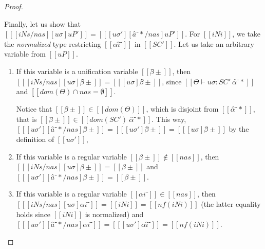 \begin{proof}
\begin{caseof}
        Finally, let us show that $[[ [iNs/nas][uσ]uP' ]] = [[ [uσ'][â⁻*/nas]uP' ]]$.
        For $[[iNi]]$, we take the \emph{normalized} type restricting $[[αî⁻]]$ in $[[SC']]$.
        Let us take an arbitrary variable from $[[uP]]$.
        \begin{enumerate}
            \item If this variable is a unification variable $[[β̂±]]$, then
                $[[ [iNs/nas][uσ] β̂± ]] = [[ [uσ]β̂± ]] $, since $[[Θ ⊢ uσ : SC' \ {α̂⁻*}]]$ and 
                $[[ dom(Θ) ∩ {nas} = ∅ ]]$. 

                Notice that $[[β̂±]] \in [[dom(Θ)]]$, which is disjoint from $[[{α̂⁻*}]]$, 
                that is $[[β̂±]] \in [[dom(SC') \ {α̂⁻*}]]$. This way,
                $[[ [uσ'][â⁻*/nas]β̂± ]] = [[  [uσ']β̂± ]] = [[ [uσ]β̂± ]]$ by the definition 
                of $[[uσ']]$,
            \item If this variable is a regular variable $[[β±]] \notin [[nas]]$, then 
                $[[ [iNs/nas][uσ] β± ]] = [[ β± ]] $ and $[[ [uσ'][â⁻*/nas]β± ]] = [[ β± ]]$. 
            \item If this variable is a regular variable $[[αi⁻]] \in [[nas]]$, then 
                $[[ [iNs/nas][uσ] αi⁻ ]] = [[ iNi ]] = [[ nf(iNi) ]]$
                (the latter equality holds since $[[iNi]]$ is normalized)
                and $[[ [uσ'][â⁻*/nas]αi⁻ ]] = [[  [uσ']αî⁻ ]] = [[ nf(iNi) ]]$.
        \end{enumerate}
    \end{caseof}
\end{proof}

